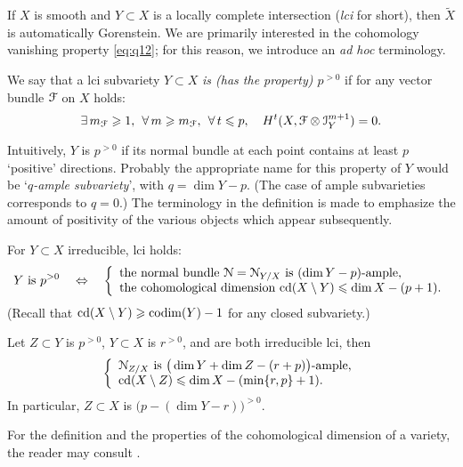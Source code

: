 \documentclass[11pt,reqno]{amsart}
\let\euf\EuScript
\let\tld\tilde
\let\nit\noindent
\numberwithin{equation}{section}
\numberwithin{figure}{section}
\let\sm\setminus
\let\ges\geqslant
\let\les\leqslant
\begin{document}
If $X$ is smooth and $Y\subset X$ is a locally complete intersection 
(\emph{lci} for short), then $\tld X$ is automatically Gorenstein. 
We are primarily interested in the cohomology vanishing property \eqref{eq:q12}; 
for this reason, we introduce an \textit{ad hoc} terminology. 

\begin{m-definition}\label{def:p>0}
We say that a lci subvariety $Y\subset X$ 
\emph{is (has the property) $p^{{>0}}$} if for any vector bundle ${{\euf F}}$ on $X$ holds: 
\begin{equation}\label{eq:p}
\exists\,m_{{\euf F}}\ges 1,\kern1ex
\forall\,m\ges m_{{\euf F}},\kern1ex
\forall\,t\les p,\quad
H^t(X,{{\euf F}}\otimes{{\euf I}}_Y^{m+1})=0.
\end{equation}
\end{m-definition}
Intuitively, $Y$ is $p^{{>0}}$ if its normal bundle at each point contains at least $p$ 
`positive' directions.
Probably the appropriate name for this property of $Y$ would be 
`\emph{$q$-ample subvariety}', with $q=\dim Y-p$. 
(The case of ample subvarieties \cite{ot} corresponds to $q=0$.) 
The terminology in the definition is made to emphasize the amount of positivity 
of the various objects which appear subsequently. 

\begin{m-proposition}\label{prop:trans}
\nit{\rm(i)} 
 For $Y\subset X$ irreducible, lci holds: 
\begin{equation}\label{eq:equiv-p}
\text{$Y$ is $p^{{>0}}$}
\quad\Leftrightarrow\quad 
\left\{\begin{array}{l}
\text{the normal bundle ${{\euf N}}={{\euf N}}_{Y/X}$ is $(\dim Y-p)$-ample,} 
\\ 
\text{the cohomological dimension ${{\rm cd}}(X\sm Y)\les\dim X-(p+1)$}. 
\end{array}\right.
\end{equation}
(Recall that ${{\rm cd}}(X\sm Y)\ges{{\rm codim}}(Y)-1$ for any closed subvariety.)

\nit{\rm(ii)} 
Let $Z\subset Y$ is $p^{{>0}}$, $Y\subset X$ is $r^{{>0}}$, 
and are both irreducible lci, then 
\begin{equation}\label{eq:trans-p}
\left\{
\begin{array}{l}
\text{${{\euf N}}_{Z/X}$ is $\big(\dim Y+\dim Z-(r+p)\big)$-ample,}
\\ 
\text{${{\rm cd}}(X\sm Z)\les\dim X-(\min\{r,p\}+1)$}.
\end{array}\right.
\end{equation}
In particular,  $Z\subset X$ is $\big(p-(\dim Y-r)\big)^{{>0}}$. 
\end{m-proposition}
For the definition and the properties of the cohomological dimension of a variety, the reader may consult \cite[Ch. III, \S3]{hart-as}.
\end{document}
